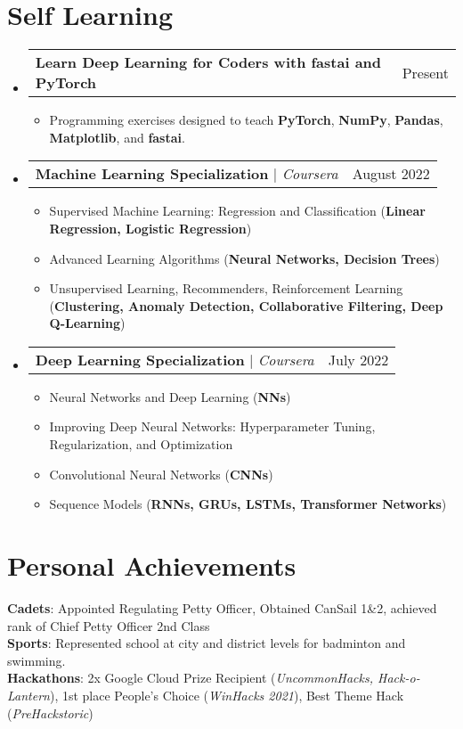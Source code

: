 \documentclass[letterpaper,11pt]{article}
\makeatletter
\newcommand{\resumeItem}[1]{
  \item\small{
    {#1 \vspace{-2pt}}
  }
}
\newcommand{\resumeProjectHeading}[2]{
    \item
    \begin{tabular*}{0.97\textwidth}{l@{\extracolsep{\fill}}r}
      \small#1 & #2 \\
    \end{tabular*}\vspace{-7pt}
}
\newcommand{\resumeSubHeadingListStart}{\begin{itemize}[leftmargin=0.15in, label={}]}
\newcommand{\resumeSubHeadingListEnd}{\end{itemize}}
\newcommand{\resumeItemListStart}{\begin{itemize}}
\newcommand{\resumeItemListEnd}{\end{itemize}\vspace{-5pt}}
\makeatother
\begin{document}
\section{Self Learning}
    \resumeSubHeadingListStart
      \resumeProjectHeading
          {\textbf{Learn Deep Learning for Coders with fastai and PyTorch}}{Present}
          \resumeItemListStart
              \resumeItem {Programming exercises designed to teach \textbf{PyTorch}, \textbf{NumPy}, \textbf{Pandas}, \textbf{Matplotlib}, and \textbf{fastai}.}
          \resumeItemListEnd
      \resumeProjectHeading
          {\textbf{Machine Learning Specialization} $|$ \emph{Coursera}}{August 2022}
          \resumeItemListStart
                \resumeItem {Supervised Machine Learning: Regression and Classification (\textbf{Linear Regression, Logistic Regression})}
                \resumeItem {Advanced Learning Algorithms (\textbf{Neural Networks, Decision Trees})}
                \resumeItem {Unsupervised Learning, Recommenders, Reinforcement Learning (\textbf{Clustering, Anomaly Detection, Collaborative Filtering, Deep Q-Learning})}
          \resumeItemListEnd
      \resumeProjectHeading
          {\textbf{Deep Learning Specialization} $|$ \emph{Coursera}}{July 2022}
          \resumeItemListStart
                \resumeItem {Neural Networks and Deep Learning (\textbf{NNs})}
                \resumeItem {Improving Deep Neural Networks: Hyperparameter Tuning, Regularization, and Optimization}
                \resumeItem {Convolutional Neural Networks (\textbf{CNNs})}
                \resumeItem {Sequence Models (\textbf{RNNs, GRUs, LSTMs, Transformer Networks})}
          \resumeItemListEnd
    \resumeSubHeadingListEnd

\section{Personal Achievements}
 \begin{itemize}[leftmargin=0.15in, label={}]
    \small{\item{
     \textbf{Cadets}{: Appointed Regulating Petty Officer, Obtained CanSail 1\&2, achieved rank of Chief Petty Officer 2nd Class} \\
     \textbf{Sports}{: Represented school at city and district levels for badminton and swimming.} \\
     \textbf{Hackathons}{: 2x Google Cloud Prize Recipient (\emph{UncommonHacks, Hack-o-Lantern}), 1st place People's Choice (\emph{WinHacks 2021}), Best Theme Hack (\emph{PreHackstoric}) } \\
    }}
 \end{itemize}


\end{document}
